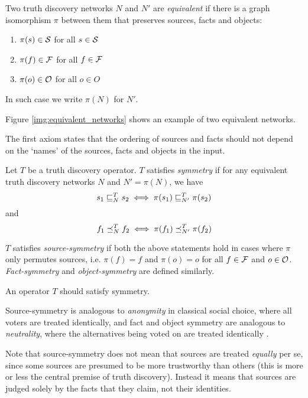 \documentclass[../main.tex]{subfiles}
\begin{document}
\begin{definition}
Two truth discovery networks $N$ and $N'$ are \emph{equivalent} if there is a
graph isomorphism $\pi$ between them that preserves sources, facts and objects:
\begin{enumerate}
\item $\pi(s) \in \S$ for all $s \in \S$
\item $\pi(f) \in \F$ for all $f \in \F$
\item $\pi(o) \in \O$ for all $o \in O$
\end{enumerate}

In such case we write $\pi(N)$ for $N'$.
\end{definition}

Figure \ref{img:equivalent_networks} shows an example of two equivalent
networks.

The first axiom states that the ordering of sources and facts should not depend
on the `names' of the sources, facts and objects in the input.

\begin{definition}
Let $T$ be a truth discovery operator. $T$ satisfies \emph{symmetry} if for
any equivalent truth discovery networks $N$ and $N' = \pi(N)$, we have
$$ s_1 \sle_N^T s_2 \iff \pi(s_1) \sle_{N'}^T \pi(s_2) $$
and
$$ f_1 \fle_N^T f_2 \iff \pi(f_1) \fle_{N'}^T \pi(f_2) $$

$T$ satisfies \emph{source-symmetry} if both the above statements hold in cases
where $\pi$ only permutes sources, i.e. $\pi(f)=f$ and $\pi(o)=o$ for all $f
\in \F$ and $o \in \O$. \emph{Fact-symmetry} and \emph{object-symmetry} are
defined similarly.
\end{definition}

\begin{axiom}[Symmetry]
\label{axiom:symm}
An operator $T$ should satisfy symmetry.
\end{axiom}

Source-symmetry is analogous to \emph{anonymity} in classical social choice,
where all voters are treated identically, and fact and object symmetry are
analogous to \emph{neutrality}, where the alternatives being
voted on are treated identically \cite{handbook_voting}.

Note that source-symmetry does not mean that sources are treated \emph{equally}
per se, since some sources are presumed to be more trustworthy than others
(this is more or less the central premise of truth discovery). Instead it means
that sources are judged solely by the facts that they claim, not their
identities.
\end{document}
